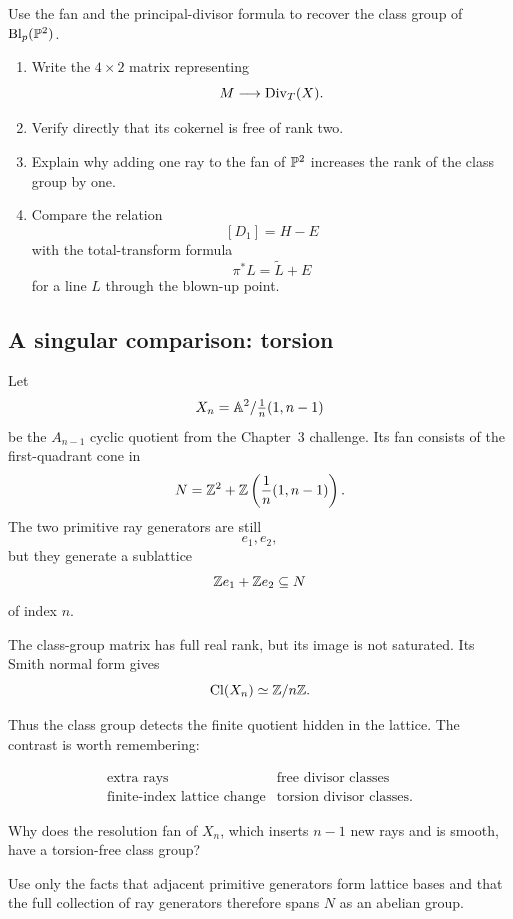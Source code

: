 \begin{surfacelaboratory}
Use the fan and the principal-divisor formula to recover the class
group of \(\Blp{\PP^2}{p}\).

\begin{enumerate}[label=(\alph*),wide=0pt]
\item Write the \(4\times2\) matrix representing
\[
M\longrightarrow\Div_T(X).
\]

\item Verify directly that its cokernel is free of rank two.

\item Explain why adding one ray to the fan of \(\PP^2\) increases the
rank of the class group by one.

\item Compare the relation
\[
[D_1]=H-E
\]
with the total-transform formula
\[
\pi^*L=\widetilde L+E
\]
for a line \(L\) through the blown-up point.
\end{enumerate}
\end{surfacelaboratory}

\subsection{A singular comparison: torsion}

Let
\[
X_n
=
\AAA^2/\tfrac1n(1,n-1)
\]
be the \(A_{n-1}\) cyclic quotient from the Chapter~3 challenge. Its
fan consists of the first-quadrant cone in
\[
N
=
\ZZ^2+
\ZZ\left(\frac1n(1,n-1)\right).
\]
The two primitive ray generators are still
\[
e_1,e_2,
\]
but they generate a sublattice
\[
\ZZ e_1+\ZZ e_2\subseteq N
\]
of index \(n\).

The class-group matrix has full real rank, but its image is not
saturated. Its Smith normal form gives
\[
\Cl(X_n)
\simeq
\ZZ/n\ZZ.
\]

Thus the class group detects the finite quotient hidden in the
lattice. The contrast is worth remembering:

\[
\begin{array}{c|c}
\text{extra rays}
&
\text{free divisor classes}
\\
\hline
\text{finite-index lattice change}
&
\text{torsion divisor classes}.
\end{array}
\]

\begin{pauseandthink}
Why does the resolution fan of \(X_n\), which inserts \(n-1\) new
rays and is smooth, have a torsion-free class group?

Use only the facts that adjacent primitive generators form lattice
bases and that the full collection of ray generators therefore spans
\(N\) as an abelian group.
\end{pauseandthink}

